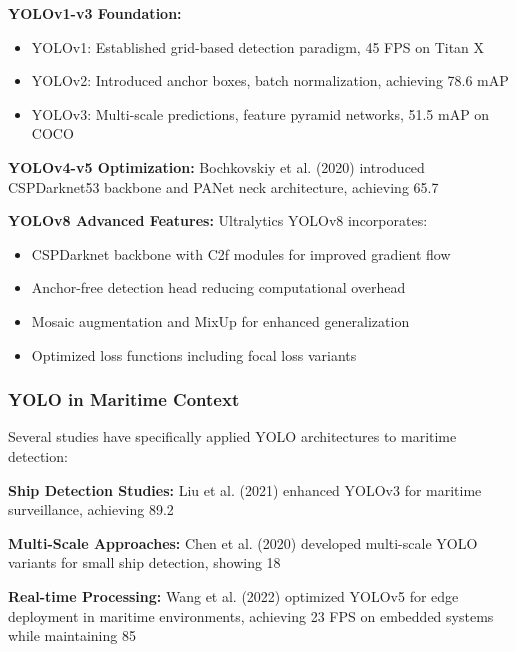 \documentclass[a4paper,11pt]{article}
\begin{document}
\textbf{YOLOv1-v3 Foundation:}
\begin{itemize}
    \item YOLOv1: Established grid-based detection paradigm, 45 FPS on Titan X
    \item YOLOv2: Introduced anchor boxes, batch normalization, achieving 78.6 mAP
    \item YOLOv3: Multi-scale predictions, feature pyramid networks, 51.5 mAP on COCO
\end{itemize}

\textbf{YOLOv4-v5 Optimization:}
Bochkovskiy et al. (2020) \cite{bochkovskiy2020yolov4} introduced CSPDarknet53 backbone and PANet neck architecture, achieving 65.7%

\textbf{YOLOv8 Advanced Features:}
Ultralytics YOLOv8 \cite{ultralytics2023yolov8} incorporates:
\begin{itemize}
    \item CSPDarknet backbone with C2f modules for improved gradient flow
    \item Anchor-free detection head reducing computational overhead
    \item Mosaic augmentation and MixUp for enhanced generalization
    \item Optimized loss functions including focal loss variants
\end{itemize}

\subsubsection{YOLO in Maritime Context}
Several studies have specifically applied YOLO architectures to maritime detection:

\textbf{Ship Detection Studies:} Liu et al. (2021) \cite{liu2021enhanced} enhanced YOLOv3 for maritime surveillance, achieving 89.2%

\textbf{Multi-Scale Approaches:} Chen et al. (2020) \cite{chen2020improved} developed multi-scale YOLO variants for small ship detection, showing 18%

\textbf{Real-time Processing:} Wang et al. (2022) \cite{wang2022realtime} optimized YOLOv5 for edge deployment in maritime environments, achieving 23 FPS on embedded systems while maintaining 85%
\end{document}
